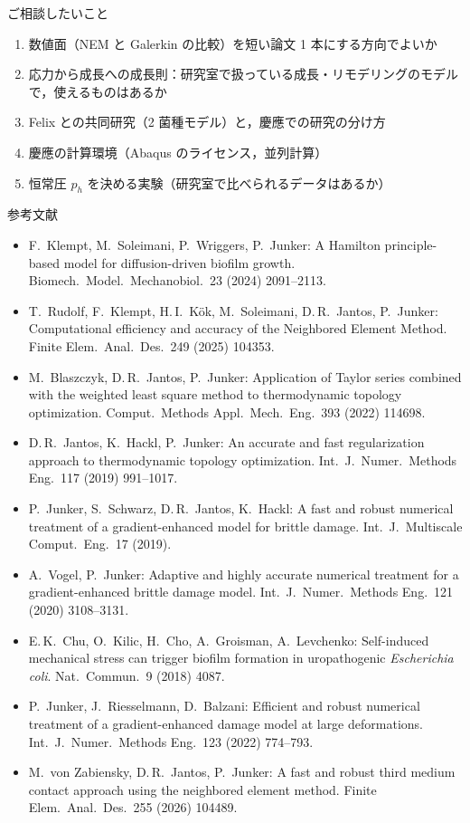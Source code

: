 \documentclass[aspectratio=169,11pt]{beamer}
\begin{document}
\begin{frame}{ご相談したいこと}
\begin{enumerate}
  \item 数値面（NEM と Galerkin の比較）を短い論文 1 本にする方向でよいか
  \item 応力から成長への成長則：研究室で扱っている成長・リモデリングのモデルで，使えるものはあるか
  \item Felix との共同研究（2 菌種モデル）と，慶應での研究の分け方
  \item 慶應の計算環境（Abaqus のライセンス，並列計算）
  \item 恒常圧 $p_h$ を決める実験（研究室で比べられるデータはあるか）
\end{enumerate}
\end{frame}

\begin{frame}{参考文献}
\scriptsize
\begin{itemize}
  \item F.\ Klempt, M.\ Soleimani, P.\ Wriggers, P.\ Junker: A Hamilton principle-based model for diffusion-driven biofilm growth. Biomech.\ Model.\ Mechanobiol.\ 23 (2024) 2091--2113.
  \item T.\ Rudolf, F.\ Klempt, H.\,I.\ Kök, M.\ Soleimani, D.\,R.\ Jantos, P.\ Junker: Computational efficiency and accuracy of the Neighbored Element Method. Finite Elem.\ Anal.\ Des.\ 249 (2025) 104353.
  \item M.\ Blaszczyk, D.\,R.\ Jantos, P.\ Junker: Application of Taylor series combined with the weighted least square method to thermodynamic topology optimization. Comput.\ Methods Appl.\ Mech.\ Eng.\ 393 (2022) 114698.
  \item D.\,R.\ Jantos, K.\ Hackl, P.\ Junker: An accurate and fast regularization approach to thermodynamic topology optimization. Int.\ J.\ Numer.\ Methods Eng.\ 117 (2019) 991--1017.
  \item P.\ Junker, S.\ Schwarz, D.\,R.\ Jantos, K.\ Hackl: A fast and robust numerical treatment of a gradient-enhanced model for brittle damage. Int.\ J.\ Multiscale Comput.\ Eng.\ 17 (2019).
  \item A.\ Vogel, P.\ Junker: Adaptive and highly accurate numerical treatment for a gradient-enhanced brittle damage model. Int.\ J.\ Numer.\ Methods Eng.\ 121 (2020) 3108--3131.
  \item E.\,K.\ Chu, O.\ Kilic, H.\ Cho, A.\ Groisman, A.\ Levchenko: Self-induced mechanical stress can trigger biofilm formation in uropathogenic \emph{Escherichia coli}. Nat.\ Commun.\ 9 (2018) 4087.
  \item P.\ Junker, J.\ Riesselmann, D.\ Balzani: Efficient and robust numerical treatment of a gradient-enhanced damage model at large deformations. Int.\ J.\ Numer.\ Methods Eng.\ 123 (2022) 774--793.
  \item M.\ von Zabiensky, D.\,R.\ Jantos, P.\ Junker: A fast and robust third medium contact approach using the neighbored element method. Finite Elem.\ Anal.\ Des.\ 255 (2026) 104489.
\end{itemize}
\end{frame}
\end{document}
